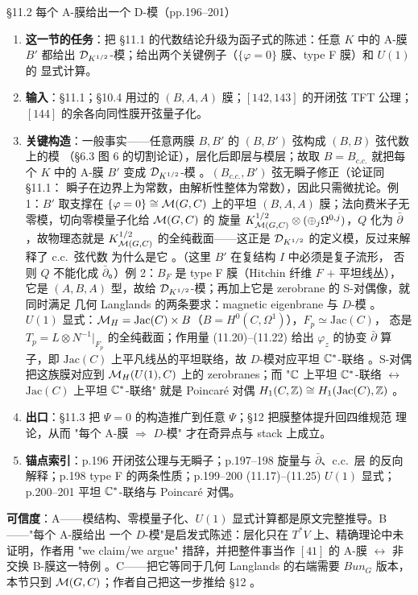 \begin{kcard}{\S11.2 每个 A-膜给出一个 D-模（pp.196--201）}
\begin{enumerate}[label=\textbf{\arabic*}]
\item \textbf{这一节的任务}：把 \S11.1 的代数结论升级为函子式的陈述：任意 $K$ 中的 A-膜 $B'$
  都给出 $\mathcal{D}_{K^{1/2}}$-模；给出两个关键例子（$\{\varphi=0\}$ 膜、type F 膜）和 $U(1)$ 的
  显式计算。
\item \textbf{输入}：\S11.1；\S10.4 用过的 $(B,A,A)$ 膜；$[142,143]$ 的开闭弦 TFT 公理；
  $[144]$ 的余各向同性膜开弦量子化。
\item \textbf{关键构造}：一般事实——任意两膜 $B,B'$ 的 $(B,B')$ 弦构成 $(B,B)$ 弦代数上的模
  （\S6.3 图 6 的切割论证），层化后即层与模层；故取 $B=B_{c.c.}$ 就把每个 $K$ 中的 A-膜 $B'$
  变成 $\mathcal{D}_{K^{1/2}}$-模 \pA{}。$(B_{c.c.},B')$ 弦无瞬子修正（论证同 \S11.1：
  瞬子在边界上为常数，由解析性整体为常数），因此只需微扰论。例 1：$B'$ 取支撑在
  $\{\varphi=0\}\cong\mathcal{M}(G,C)$ 上的平坦 $(B,A,A)$ 膜；法向费米子无零模，切向零模量子化给 $\mathcal{M}(G,C)$ 的
  旋量 $K_{\mathcal{M}(G,C)}^{1/2}\otimes(\oplus_j\Omega^{0,j})$，$Q$ 化为 $\bar\partial$，故物理态就是
  $K_{\mathcal{M}(G,C)}^{1/2}$ 的全纯截面——这正是 $\mathcal{D}_{K^{1/2}}$ 的定义模，反过来解释了 c.c.\ 弦代数
  为什么是它 \pA{}。（这里 $B'$ 在复结构 $I$ 中必须是复子流形，
  否则 $Q$ 不能化成 $\bar\partial$。）例 2：$B_F$ 是 type F 膜（Hitchin 纤维 $F$ $+$ 平坦线丛），
  它是 $(A,B,A)$ 型，故给 $\mathcal{D}_{K^{1/2}}$-模；再加上它是 zerobrane 的 S-对偶像，就同时满足
  几何 Langlands 的两条要求：magnetic eigenbrane 与 $D$-模 \pA{}。
  $U(1)$ 显式：$\mathcal{M}_H=\mathrm{Jac}(C)\times B$（$B=H^0(C,\Omega^1)$），$F_p\simeq\mathrm{Jac}(C)$，
  态是 $T_p=L\otimes N^{-1}|_{F_p}$ 的全纯截面；作用量 (11.20)--(11.22) 给出 $\varphi_z$ 的协变
  $\bar\partial$ 算子，即 $\mathrm{Jac}(C)$ 上平凡线丛的平坦联络，故 $D$-模对应平坦
  $\mathbb{C}^*$-联络 \pA{}。S-对偶把这族膜对应到 $\mathcal{M}_H(U(1),C)$ 上的
  zerobranes；而 "$\mathbb{C}$ 上平坦 $\mathbb{C}^*$-联络 $\leftrightarrow$ $\mathrm{Jac}(C)$ 上平坦
  $\mathbb{C}^*$-联络" 就是 Poincaré 对偶 $H_1(C,\mathbb{Z})\cong H_1(\mathrm{Jac}(C),\mathbb{Z})$
  \pA{}。
\item \textbf{出口}：\S11.3 把 $\Psi=0$ 的构造推广到任意 $\Psi$；\S12 把膜整体提升回四维规范
  理论，从而 "每个 A-膜 $\Rightarrow$ $D$-模" 才在奇异点与 stack 上成立。
\item \textbf{锚点索引}：p.196 开闭弦公理与无瞬子；p.197--198 旋量与 $\bar\partial$、c.c.\ 层
  的反向解释；p.198 type F 的两条性质；p.199--200 (11.17)--(11.25) $U(1)$ 显式；p.200--201 平坦
  $\mathbb{C}^*$-联络与 Poincaré 对偶。
\end{enumerate}
\textbf{可信度}：A——模结构、零模量子化、$U(1)$ 显式计算都是原文完整推导。B——"每个 A-膜给出
一个 $D$-模"是启发式陈述：层化只在 $T^*V$ 上、精确理论中未证明，作者用 "we claim/we argue"
措辞，并把整件事当作 $[41]$ 的 A-膜 $\leftrightarrow$ 非交换 B-膜这一特例
\pB{}。C——把它等同于几何 Langlands 的右端需要 $Bun_G$ 版本，本节只到
$\mathcal{M}(G,C)$；作者自己把这一步推给 \S12 \pC{}。
\end{kcard}

